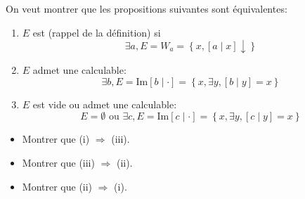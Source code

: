 \begin{td-exo} %
	On veut montrer que les propositions suivantes sont équivalentes:
	\begin{enumerate}[label=(\roman*)] %
		\item \(E\) est  (rappel de la définition) si
		\begin{equation*}
			\exists a, E = W_a = \left\{x, [a\mid x]\downarrow\right\}
		\end{equation*}

		\item \(E\) admet une  calculable:
		\begin{equation*}
			\exists b, E = \text{Im}[b\mid \cdot] = \left\{x, \exists y, [b\mid y] = x\right\}
		\end{equation*}

		\item \(E\) est vide ou admet une  calculable:
		\begin{equation*}
			E = \emptyset \text{ ou } \exists c, E = \text{Im}[c\mid \cdot] = \left\{x, \exists y, [c\mid y] = x\right\}
		\end{equation*}
	\end{enumerate}
	\begin{itemize}
		\item Montrer que (i) \(\Rightarrow\) (iii).
		\item Montrer que (iii) \(\Rightarrow\) (ii).
		\item Montrer que (ii) \(\Rightarrow\) (i).
	\end{itemize}
\end{td-exo}

